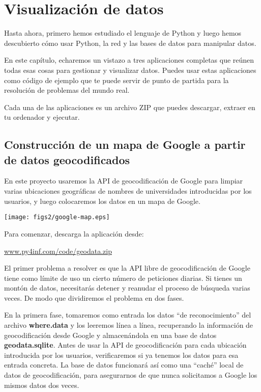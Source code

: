 
\chapter{Visualización de datos}

Hasta ahora, primero hemos estudiado el lenguaje de Python y luego
hemos descubierto cómo usar Python, la red y las bases de datos
para manipular datos.

En este capítulo, echaremos un vistazo a tres
aplicaciones completas que reúnen todas esas cosas
para gestionar y visualizar datos. Puedes usar estas aplicaciones
como código de ejemplo que te puede servir de punto de partida para la
resolución de problemas del mundo real.

Cada una de las aplicaciones es un archivo ZIP que puedes descargar,
extraer en tu ordenador y ejecutar.

\section{Construcción de un mapa de Google a partir de datos geocodificados}

En este proyecto usaremos la API de geocodificación de Google
para limpiar varias ubicaciones geográficas de nombres de universidades
introducidas por los usuarios, y luego colocaremos los datos en
un mapa de Google. 

\beforefig
\centerline{\texttt{[image: figs2/google-map.eps]}}
\afterfig

Para comenzar, descarga la aplicación desde:

\url{www.py4inf.com/code/geodata.zip}

El primer problema a resolver es que la API libre de geocodificación
de Google tiene como límite de uso un cierto número de peticiones diarias. Si tienes
un montón de datos, necesitarás detener y reanudar el proceso de
búsqueda varias veces. De modo que dividiremos el problema en
dos fases.

En la primera fase, tomaremos como entrada los datos ``de reconocimiento'' del archivo
{\bf where.data} y los leeremos línea a línea, recuperando la
información de geocodificación desde Google y almacenándola
en una base de datos {\bf geodata.sqlite}.
Antes de usar la API de geocodificación para cada ubicación introducida por los usuarios,
verificaremos si ya tenemos los datos para esa entrada
concreta. La base de datos funcionará así como una ``caché'' local
de datos de geocodificación, para asegurarnos de que nunca solicitamos
a Google los mismos datos dos veces.

